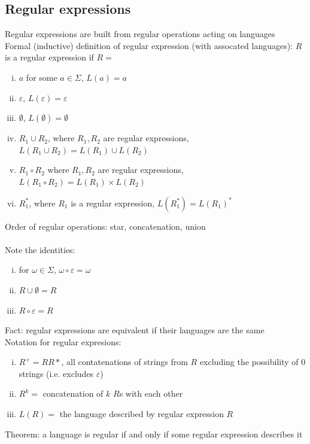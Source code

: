 \documentclass{article}
\newcommand*{\<}{\langle}
\renewcommand*{\>}{\rangle}
\begin{document}
		\subsection{Regular expressions}
			Regular expressions are built from regular operations acting on languages \\
			Formal (inductive) definition of regular expression (with assocated languages): $R$ is a regular expression if $R = $
			\begin{enumerate}[(i)]
				\item $a$ for some $a \in \Sigma$, $L(a) = {a}$
				\item $\varepsilon$, $L(\varepsilon) = {\varepsilon}$
				\item $\emptyset$, $L(\emptyset) = \emptyset$
				\item $R_1 \cup R_2$, where $R_1, R_2$ are regular expressions, $L(R_1 \cup R_2) = L(R_1) \cup L(R_2)$
				\item $R_1 \circ R_2$ where $R_1, R_2$ are regular expressions, $L(R_1 \circ R_2) = L(R_1) \times L(R_2)$
				\item $R_1^*$, where $R_1$ is a regular expression, $L(R_1^*) = L(R_1)^*$
				\end{enumerate}
			Order of regular operations: star, concatenation, union \\
			\\
			Note the identities:
			\begin{enumerate}[(i)]
				\item for $\omega \in \Sigma$, $\omega \circ \varepsilon = \omega$
				\item $R \cup \emptyset = R$
				\item $R \circ \varepsilon = R$
				\end{enumerate}
			Fact: regular expressions are equivalent if their languages are the same
			\\
			Notation for regular expresions:
			\begin{enumerate}[(i)]
				\item $R^+ = RR*$, all contatenations of strings from $R$ excluding the possibility of 0 strings (i.e. excludes $\varepsilon$)
				\item $R^k =$ concatenation of $k$ $R$s with each other
				\item $L(R) =$ the language described by regular expression $R$ 
				\end{enumerate}
			Theorem: a language is regular if and only if some regular expression describes it \\
\end{document}
